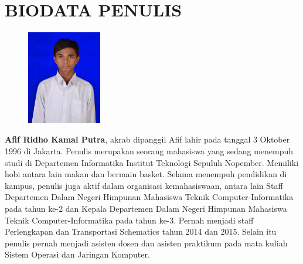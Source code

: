 \documentclass[12pt,oneside,reqno]{ta-its}
\begin{document}
\renewcommand{\thelstlisting}{\arabic{chapter}.\arabic{lstlisting}}
	\frontmatter %
	\maketitle
	\legalityPaper %
	
    
	

	\cleardoublepage %

	\tableofcontents %
	\listoftables %
	\listoffigures %
	\lstlistoflistings %

	\mainmatter
	
	
	
	
	
	

	
	
    
    \renewcommand\chaptername{LAMPIRAN}
	\appendix
    
    

	\appendix

	\backmatter %
	\chapter{BIODATA PENULIS}
		\begin{figure}
			\includegraphics[width=0.29\textwidth]{Images/MFR.jpg}
		\end{figure}
		
		\textbf{Afif Ridho Kamal Putra}, akrab dipanggil Afif lahir pada tanggal 3 Oktober 1996 di Jakarta. Penulis merupakan seorang mahasiswa yang sedang menempuh studi di Departemen Informatika Institut Teknologi Sepuluh Nopember. Memiliki hobi antara lain makan dan bermain basket. Selama menempuh pendidikan di kampus, penulis juga aktif dalam organisasi kemahasiswaan, antara lain Staff Departemen Dalam Negeri Himpunan Mahasiswa Teknik Computer-Informatika pada tahun ke-2 dan Kepala Departemen Dalam Negeri Himpunan Mahasiswa Teknik Computer-Informatika pada tahun ke-3. Pernah menjadi staff Perlengkapan dan Transportasi Schematics tahun 2014 dan 2015. Selain itu penulis pernah menjadi asisten dosen dan asisten praktikum pada mata kuliah Sistem Operasi dan Jaringan Komputer.
\end{document}
